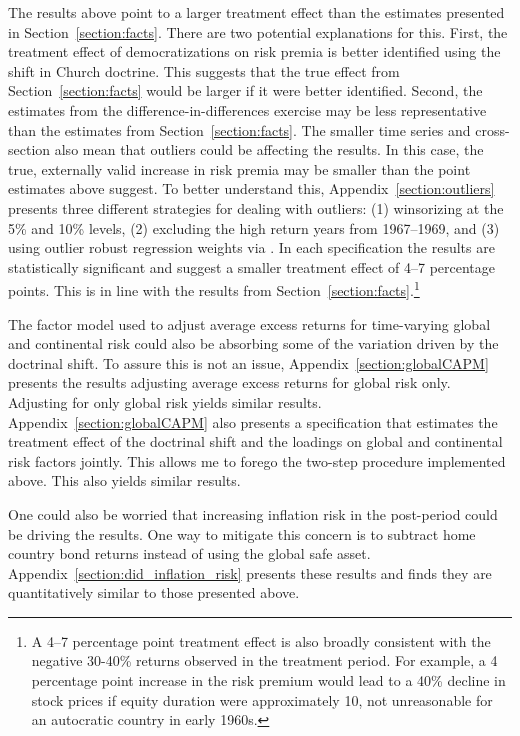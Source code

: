 \documentclass[12pt]{article}
\numberwithin{equation}{section}
\begin{document}
The results above point to a larger treatment effect than the estimates presented in Section~\ref{section:facts}. There are two potential explanations for this. First, the treatment effect of democratizations on risk premia is better identified using the shift in Church doctrine. This suggests that the true effect from Section~\ref{section:facts} would be larger if it were better identified. Second, the estimates from the difference-in-differences exercise may be less representative than the estimates from Section~\ref{section:facts}. The smaller time series and cross-section also mean that outliers could be affecting the results. In this case, the true, externally valid increase in risk premia may be smaller than the point estimates above suggest. To better understand this, Appendix~\ref{section:outliers} presents three different strategies for dealing with outliers: (1) winsorizing at the 5\% and 10\% levels, (2) excluding the high return years from 1967--1969, and (3) using outlier robust regression weights via \cite{Li2006}. In each specification the results are statistically significant and suggest a smaller treatment effect of 4--7 percentage points. This is in line with the results from Section~\ref{section:facts}.\footnote{A 4--7 percentage point treatment effect is also broadly consistent with the negative 30-40\% returns observed in the treatment period. For example, a 4 percentage point increase in the risk premium would lead to a 40\% decline in stock prices if equity duration were approximately 10, not unreasonable for an autocratic country in early 1960s.}

The factor model used to adjust average excess returns for time-varying global and continental risk could also be absorbing some of the variation driven by the doctrinal shift. To assure this is not an issue, Appendix~\ref{section:globalCAPM} presents the results adjusting average excess returns for global risk only. Adjusting for only global risk yields similar results. Appendix~\ref{section:globalCAPM} also presents a specification that estimates the treatment effect of the doctrinal shift and the loadings on global and continental risk factors jointly. This allows me to forego the two-step procedure implemented above. This also yields similar results.  

One could also be worried that increasing inflation risk in the post-period could be driving the results. One way to mitigate this concern is to subtract home country bond returns instead of using the global safe asset. Appendix~\ref{section:did_inflation_risk} presents these results and finds they are quantitatively similar to those presented above.
\end{document}
